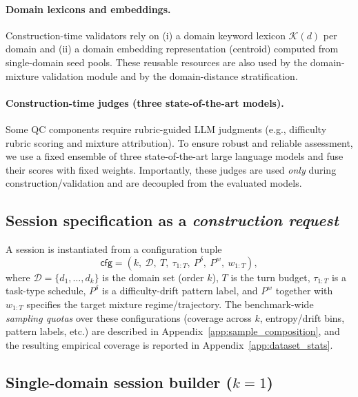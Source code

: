 \paragraph{Domain lexicons and embeddings.}
Construction-time validators rely on (i) a domain keyword lexicon $\mathcal{K}(d)$ per domain and (ii) a domain embedding representation (centroid) computed from single-domain seed pools.
These reusable resources are also used by the domain-mixture validation module and by the domain-distance stratification.

\paragraph{Construction-time judges (three state-of-the-art models).}
Some QC components require rubric-guided LLM judgments (e.g., difficulty rubric scoring and mixture attribution).
To ensure robust and reliable assessment,
we use a fixed ensemble of three state-of-the-art large language models and fuse their scores with fixed weights.
Importantly, these judges are used \emph{only} during construction/validation and are decoupled from the evaluated models.

\subsection{Session specification as a \emph{construction request}}
\label{app:construction_request}

A session is instantiated from a configuration tuple
\begin{equation}
\label{eq:configuration_tuple}
\mathsf{cfg}=\left(k,\ \mathcal{D},\ T,\ \tau_{1:T},\ P^\delta,\ P^w,\ w_{1:T}\right),
\end{equation}
where $\mathcal{D}=\{d_1,\ldots,d_k\}$ is the domain set (order $k$), $T$ is the turn budget, $\tau_{1:T}$ is a task-type schedule, $P^\delta$ is a difficulty-drift pattern label, and $P^w$ together with $w_{1:T}$ specifies the target mixture regime/trajectory.
The benchmark-wide \emph{sampling quotas} over these configurations (coverage across $k$, entropy/drift bins, pattern labels, etc.) are described in Appendix~\ref{app:sample_composition}, and the resulting empirical coverage is reported in Appendix~\ref{app:dataset_stats}.

\subsection{Single-domain session builder ($k=1$)}
\label{app:single_domain_builder}

